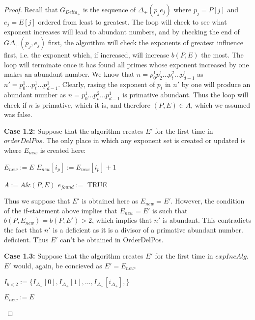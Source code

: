 \documentclass[../paper.tex]{subfiles}
\begin{document}
\begin{proof}
  Recall that $G_{Delta_+}$ is the sequence of $\Delta_+(p_j e_j)$
where $p_j = P[j]$ and $e_j = E[j]$ ordered from least to greatest.
The loop will check to see what exponent increases will lead to
abundant numbers, and by checking the end of $G\Delta_+(p_j, e_j)$
first, the algorithm will check the exponents of greatest
influence first, i.e. the exponent which, if increased, will
increase $b(P,E)$ the most. The loop will terminate once it
has found all primes whose exponent increased by one makes an
abundant number. We know that $n = p_0^1 p_2^1 ... p_t^2...
p_{d-1}^1$ as $n' = p_0^1 ... p_t^1 ... p_{d-1}^1$.
 Clearly, rasing the exponent of $p_t$ in $n'$ by one will
produce an abundant number as $n = p_0^{1} ... p_t^{2} ...
p_{d-1}^1$ is primative abundant. Thus the loop will check if $n$
is primative, which it is, and therefore $(P,E) \in A$, which we
assumed was false.

\textbf{Case 1.2:}
  Suppose that the algorithm creates $E'$ for the first time in
$orderDelPos$. The only place in which any exponent set is created
or updated is where $E_{new}$ is created here:
\begin{algorithmic}
 
		\STATE $E_{new} := E$
		\STATE $E_{new}[ i_p ] := E_{new}[ i_p ] + 1 $
		
			\STATE $A := A\&(P,E)$
			\STATE $e_{found} := $ TRUE
		\ENDIF 

  \ENDIF
\end{algorithmic}

  Thus we suppose that $E'$ is obtained here as $E_{new} = E'$.
However, the condition of the if-statement above implies that
$E_{new} = E'$ is such that $b(P,E_{new}) = b(P,E') > 2$, which
implies that $n'$ is abundant. This contradicts the fact that $n'$
is a deficient as it is a divisor of a primative abundant number.
deficient. Thus $E'$ can't be obtained in OrderDelPos.

\textbf{Case 1.3:}
  Suppose that the algorithm creates $E'$ for the first time in
$expIncAlg$. $E'$ would, again, be concieved as $E' = E_{new}$. 

\begin{algorithmic}
  \STATE $I_{b < 2} := \{I_{\Delta_{+}}[0], I_{\Delta_{+}}[1], 
	                       ..., I_{\Delta_{+}}[i_{\Delta_{+}}],\}$


  	\STATE $E_{new} := E$
		

\end{algorithmic}
\end{proof}
\end{document}
